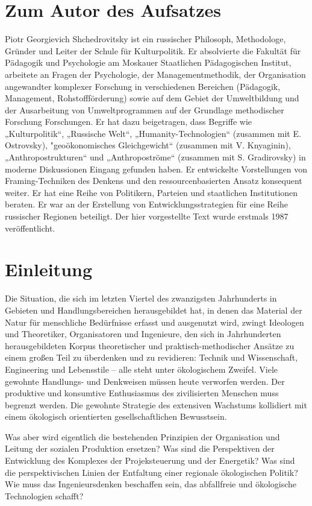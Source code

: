 \documentclass[11pt,a4paper]{article}
\begin{document}
\section*{Zum Autor des Aufsatzes}

Piotr Georgievich Shchedrovitsky ist ein russischer Philosoph, Methodologe,
Gründer und Leiter der Schule für Kulturpolitik. Er absolvierte die Fakultät
für Pädagogik und Psychologie am Moskauer Staatlichen Pädagogischen Institut,
arbeitete an Fragen der Psychologie, der Managementmethodik, der Organisation
angewandter komplexer Forschung in verschiedenen Bereichen (Pädagogik,
Management, Rohstoff\-förderung) sowie auf dem Gebiet der Umweltbildung und
der Ausarbeitung von Umweltprogrammen auf der Grundlage methodischer Forschung
Forschungen.  Er hat dazu beigetragen, dass Begriffe wie „Kulturpolitik“,
„Russische Welt“, „Humanity-Technologien“ (zusammen mit E. Ostrovsky),
"geoökonomisches Gleichgewicht“ (zusammen mit V. Knyaginin),
„Anthropostrukturen“ und „Anthropoströme“ (zusammen mit S.  Gradirovsky) in
moderne Diskussionen Eingang gefunden haben. Er entwickelte Vorstellungen von
Framing-Techniken des Denkens und den ressourcenbasierten Ansatz konsequent
weiter. Er hat eine Reihe von Politikern, Parteien und staatlichen
Institutionen beraten.  Er war an der Erstellung von Entwicklungsstrategien
für eine Reihe russischer Regionen beteiligt.  Der hier vorgestellte Text
wurde erstmals 1987 veröffentlicht.

\section{Einleitung}

Die Situation, die sich im letzten Viertel des zwanzigsten Jahrhunderts in
Gebieten und Handlungsbereichen herausgebildet hat, in denen das Material der
Natur für menschliche Bedürfnisse erfasst und ausgenutzt wird, zwingt
Ideologen und Theoretiker, Organisatoren und Ingenieure, den sich in
Jahrhunderten herausgebildeten Korpus theoretischer und praktisch-methodischer
Ansätze zu einem großen Teil zu überdenken und zu revidieren: Technik und
Wissenschaft, Engineering und Lebensstile -- alle steht unter ökologischem
Zweifel. Viele gewohnte Handlungs- und Denkweisen müssen heute verworfen
werden.  Der produktive und konsumtive Enthusiasmus des zivilisierten Menschen
muss begrenzt werden. Die gewohnte Strategie des extensiven Wachstums
kollidiert mit einem ökologisch orientierten gesellschaftlichen Bewusstsein.

Was aber wird eigentlich die bestehenden Prinzipien der Organisation und
Leitung der sozialen Produktion ersetzen? Was sind die Perspektiven der
Entwicklung des Komplexes der Projeksteuerung und der Energetik? Was sind die
perspektivischen Linien der Entfaltung einer regionale ökologischen Politik?
Wie muss das Ingenieursdenken beschaffen sein, das abfallfreie und ökologische
Technologien schafft?
\end{document}
